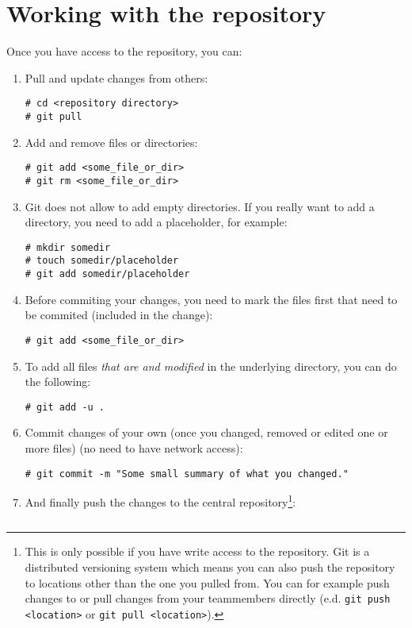 \documentclass[a4paper, 10pt]{article}
\begin{document}
\section{Working with the repository}
Once you have access to the repository, you can:
\begin{enumerate}
    \item Pull and update changes from others:
\begin{lstlisting}
# cd <repository directory>
# git pull
\end{lstlisting}
    \item Add and remove files or directories:
\begin{lstlisting}
# git add <some_file_or_dir>
# git rm <some_file_or_dir>
\end{lstlisting}
    \item Git does not allow to add empty directories. If you really want to add a directory, you need to add a placeholder, for example:
\begin{lstlisting}
# mkdir somedir
# touch somedir/placeholder
# git add somedir/placeholder
\end{lstlisting}
    \item Before commiting your changes, you need to mark the files first that need to be commited (included in the change):
\begin{lstlisting}
# git add <some_file_or_dir>
\end{lstlisting}
    \item To add all files \emph{that are and modified} in the underlying directory, you can do the following:
\begin{lstlisting}
# git add -u .
\end{lstlisting}
    \item Commit changes of your own (once you changed, removed or edited one or more files) (no need to have network access):
\begin{lstlisting}
# git commit -m "Some small summary of what you changed."
\end{lstlisting}
    \item And finally push the changes to the central repository\footnote{This is only possible if you have write access to the repository. Git is a distributed versioning system which means you can also push the repository to locations other than the one you pulled from. You can for example push changes to or pull changes from your teammembers directly (e.d. \lstinline{git push <location>} or \lstinline{git pull <location>}).}:
\begin{lstlisting}

\end{lstlisting}
\end{enumerate}
\end{document}
